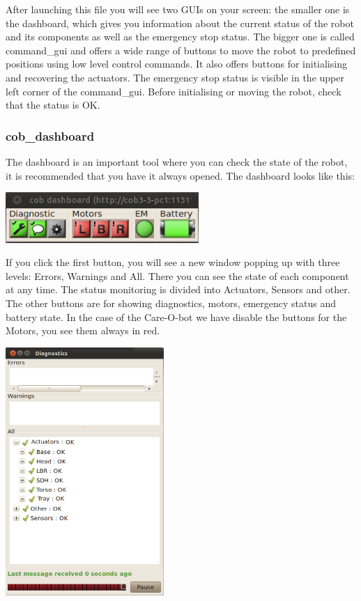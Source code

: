 After launching this file you will see two GUIs on your screen: the smaller one is the dashboard, which gives you information about the current status of the robot and its components as well as the emergency stop status. The bigger one is called command\_gui and offers a wide range of buttons to move the robot to predefined positions using low level control commands. It also offers buttons for initialising and recovering the actuators. The emergency stop status is visible in the upper left corner of the command\_gui. Before initialising or moving the robot, check that the status is OK.

\subsubsection{cob\_dashboard}\label{subsec:dashboard}
The dashboard is an important tool where you can check the state of the robot, it is recommended that you have it always opened. The dashboard looks like this:

\begin{center}
\includegraphics[width=0.55\textwidth]{images/dashboard.png}
\end{center}
If you click the first button, you will see a new window popping up with three levels: Errors, Warnings and All. There you can see the state of each component at any time. The status monitoring is divided into Actuators, Sensors and other. The other buttons are for showing diagnostics, motors, emergency status and battery state. In the case of the Care-O-bot we have disable the buttons for the Motors, you see them always in red.

\begin{center}
\includegraphics[width=0.45\textwidth]{images/diagnostics.png}
\end{center}

